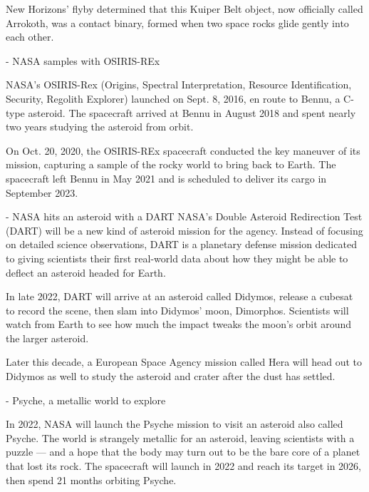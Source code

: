 New Horizons' flyby determined that this Kuiper Belt object, now officially
called Arrokoth, was a contact binary, formed when two space rocks glide gently
into each other.


- NASA samples with OSIRIS-REx

NASA's OSIRIS-Rex (Origins, Spectral Interpretation, Resource Identification,
Security, Regolith Explorer) launched on Sept. 8, 2016, en route to Bennu, a
C-type asteroid. The spacecraft arrived at Bennu in August 2018 and spent nearly
two years studying the asteroid from orbit.

On Oct. 20, 2020, the OSIRIS-REx spacecraft conducted the key maneuver of its
mission, capturing a sample of the rocky world to bring back to Earth. The
spacecraft left Bennu in May 2021 and is scheduled to deliver its cargo in
September 2023.



- NASA hits an asteroid with a DART
NASA's Double Asteroid Redirection Test (DART) will be a new kind of asteroid
mission for the agency. Instead of focusing on detailed science observations,
DART is a planetary defense mission dedicated to giving scientists their first
real-world data about how they might be able to deflect an asteroid headed for
Earth.

In late 2022, DART will arrive at an asteroid called Didymos, release a cubesat
to record the scene, then slam into Didymos' moon, Dimorphos. Scientists will
watch from Earth to see how much the impact tweaks the moon's orbit around the
larger asteroid.

Later this decade, a European Space Agency mission called Hera will head out to
Didymos as well to study the asteroid and crater after the dust has settled.


- Psyche, a metallic world to explore


In 2022, NASA will launch the Psyche mission to visit an asteroid also called
Psyche. The world is strangely metallic for an asteroid, leaving scientists with
a puzzle — and a hope that the body may turn out to be the bare core of a planet
that lost its rock. The spacecraft will launch in 2022 and reach its target
in 2026, then spend 21 months orbiting Psyche.